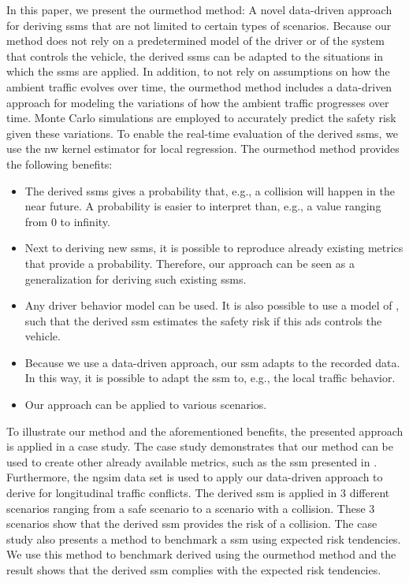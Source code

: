 \cstarta In this paper, we present the \ac{ourmethod} method: A novel data-driven approach for deriving \acp{ssm} that are not limited to certain types of scenarios.
Because our method does not rely on a predetermined model of the driver or of the system that controls the vehicle, the derived \acp{ssm} can be adapted to the situations in which the \acp{ssm} are applied. 
In addition, to not rely on assumptions on how the ambient traffic evolves over time, the \ac{ourmethod} method includes a data-driven approach for modeling the variations of how the ambient traffic progresses over time. 
Monte Carlo simulations are employed to accurately predict the safety risk given these variations.
To enable the real-time evaluation of the derived \acp{ssm}, we use the \ac{nw} kernel estimator \autocite{wasserman2006nonparametric} for local regression.
The \ac{ourmethod} method provides the following benefits: \cenda
\begin{itemize}
	\item The derived \acp{ssm} gives a probability that, e.g., a collision will happen in the near future. 
	A probability is easier to interpret than, e.g., a value ranging from 0 to infinity.
	
	\item \cstarta Next to deriving new \acp{ssm}, \cenda it is possible to reproduce already existing metrics that provide a probability. 
	Therefore, our approach can be seen as a generalization for deriving such existing \acp{ssm}.
	
	\item Any driver behavior model can be used.
	It is also possible to use a model of , such that the derived \ac{ssm} estimates the safety risk if this \ac{ads} controls the vehicle.
	
	\item Because we use a data-driven approach, our \ac{ssm} adapts to the recorded data. 
	In this way, it is possible to \cstarta adapt the \ac{ssm} to, e.g., the local traffic behavior\cenda.
	
	\item Our approach can be applied to various scenarios.
\end{itemize}

To illustrate our method and the aforementioned benefits, the presented approach is applied in a case study.
The case study demonstrates that our method can be used to create other already available metrics, such as the \ac{ssm} presented in \autocite{wang2014evaluation}.
Furthermore, the \ac{ngsim} data set \autocite{kovvali2007video} is used to apply our data-driven approach to derive  for longitudinal traffic conflicts.
The derived \ac{ssm} is applied in 3 different scenarios ranging from a safe scenario to a scenario with a collision.
These 3 scenarios show that the derived \ac{ssm} provides the risk of a collision.
The case study also presents a method to benchmark a \ac{ssm} using expected risk tendencies.
\cstarta We use this method to benchmark  derived using the \ac{ourmethod} method and the result shows that the derived \ac{ssm} complies with the expected risk tendencies. \cenda

